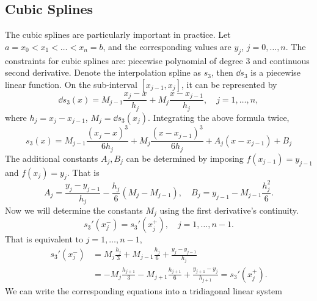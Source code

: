 \subsection{Cubic Splines}
The cubic splines are particularly important in practice. Let $a = x_0 < x_1 <\dots < x_n = b$, and the corresponding values are $y_j$, $j = 0, \dots, n$. The constraints for cubic splines are: piecewise polynomial of degree 3 and continuous second derivative. Denote the interpolation spline as $s_3$, then $\dd{s_3}$ is a piecewise linear function. On the sub-interval $[x_{j-1}, x_j]$, it can be represented by 
\begin{equation}
    \dd{s_3}(x) = M_{j-1} \frac{x_j - x}{h_j} + M_j \frac{x - x_{j-1}}{h_j},\quad j = 1,\dots, n,
\end{equation}
where $h_j = x_j - x_{j-1}$, $M_j = \dd{s_3}(x_j)$. Integrating the above formula twice, 
\begin{equation}
    s_3(x) = M_{j-1} \frac{(x_j - x)^3}{6 h_j} + M_j \frac{(x - x_{j-1})^3}{6h_j} + A_j (x - x_{j-1}) + B_j
\end{equation}
The additional constants $A_j, B_j$ can be determined by imposing $f(x_{j-1}) = y_{j-1}$ and $f(x_j) = y_j$. That is 
\begin{equation}
    A_j = \frac{y_j - y_{j-1}}{h_j} - \frac{h_j}{6}(M_j - M_{j-1}),\quad 
    B_j = y_{j-1}-  M_{j-1} \frac{h_j^2}{6}.
\end{equation}
Now we will determine the constants $M_j$ using the first derivative's continuity. 
\begin{equation}
    s_3'(x_{j}^{-})  = s_3'(x_j^{+}), \quad j = 1,\dots, n-1.
\end{equation}
That is equivalent to $j=1,\dots, n-1$, 
\begin{equation}
\label{EQ: CUB-SPL-DER}
    \begin{aligned}
        s_3'(x_{j}^{-})  &= M_j\frac{h_j}{3} + M_{j-1}\frac{h_{j}}{6} + \frac{y_j - y_{j-1}}{h_j}  \\
        &= -M_j \frac{h_{j+1}}{3}  - M_{j+1}\frac{h_{j+1}}{6} + \frac{y_{j+1} - y_j}{h_{j+1}} = s_3'(x_j^{+}). 
    \end{aligned}
\end{equation}
We can write the corresponding equations into a tridiagonal linear system 

